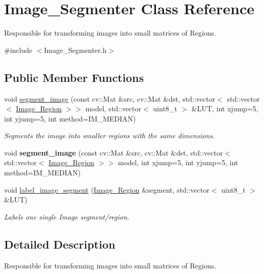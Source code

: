 \hypertarget{class_image___segmenter}{}\section{Image\+\_\+\+Segmenter Class Reference}
\label{class_image___segmenter}


Responsible for transforming images into small matrices of Regions.  




{\ttfamily \#include $<$Image\+\_\+\+Segmenter.\+h$>$}

\subsection*{Public Member Functions}
\begin{DoxyCompactItemize}
\item 
void \hyperlink{class_image___segmenter_a870ea17617700926ae337d2f93465393}{segment\+\_\+image} (const cv\+::\+Mat \&src, cv\+::\+Mat \&dst, std\+::vector$<$ std\+::vector$<$ \hyperlink{class_image___region}{Image\+\_\+\+Region} $>$$>$ model, std\+::vector$<$ uint8\+\_\+t $>$ \&L\+UT, int xjump=5, int yjump=5, int method=I\+M\+\_\+\+M\+E\+D\+I\+AN)
\begin{DoxyCompactList}\small\item\em Segments the image into smaller regions with the same dimensions. \end{DoxyCompactList}\item 
\mbox{\label{class_image___segmenter_acbf4042bec4d7eb0a36114db5abd5cf9}} 
void {\bfseries segment\+\_\+image} (const cv\+::\+Mat \&src, cv\+::\+Mat \&dst, std\+::vector$<$ std\+::vector$<$ \hyperlink{class_image___region}{Image\+\_\+\+Region} $>$$>$ model, int xjump=5, int yjump=5, int method=I\+M\+\_\+\+M\+E\+D\+I\+AN)
\item 
void \hyperlink{class_image___segmenter_aee5692fbdcf547fa9ac5e2fa3470adef}{label\+\_\+image\+\_\+segment} (\hyperlink{class_image___region}{Image\+\_\+\+Region} \&segment, std\+::vector$<$ uint8\+\_\+t $>$ \&L\+UT)
\begin{DoxyCompactList}\small\item\em Labels one single Image segment/region. \end{DoxyCompactList}\end{DoxyCompactItemize}


\subsection{Detailed Description}
Responsible for transforming images into small matrices of Regions. 

